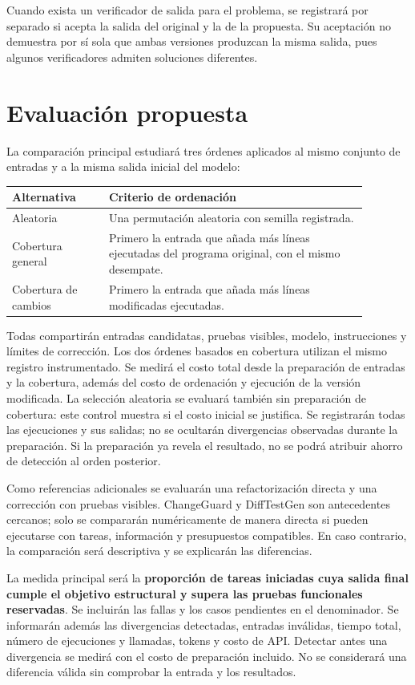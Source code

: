 \documentclass[11pt,openright,final]{unsa}
\begin{document}
Cuando exista un verificador de salida para el problema, se registrará por separado si acepta la salida del original y la de la propuesta. Su aceptación no demuestra por sí sola que ambas versiones produzcan la misma salida, pues algunos verificadores admiten soluciones diferentes.

\section{Evaluación propuesta}

La comparación principal estudiará tres órdenes aplicados al mismo conjunto de entradas y a la misma salida inicial del modelo:

\begin{longtable}{p{0.24\linewidth}p{0.64\linewidth}}
Alternativa & Criterio de ordenación \\
\hline
Aleatoria & Una permutación aleatoria con semilla registrada. \\
Cobertura general & Primero la entrada que añada más líneas ejecutadas del programa original, con el mismo desempate. \\
Cobertura de cambios & Primero la entrada que añada más líneas modificadas ejecutadas. \\
\end{longtable}

Todas compartirán entradas candidatas, pruebas visibles, modelo, instrucciones y límites de corrección. Los dos órdenes basados en cobertura utilizan el mismo registro instrumentado. Se medirá el costo total desde la preparación de entradas y la cobertura, además del costo de ordenación y ejecución de la versión modificada. La selección aleatoria se evaluará también sin preparación de cobertura: este control muestra si el costo inicial se justifica. Se registrarán todas las ejecuciones y sus salidas; no se ocultarán divergencias observadas durante la preparación. Si la preparación ya revela el resultado, no se podrá atribuir ahorro de detección al orden posterior.

Como referencias adicionales se evaluarán una refactorización directa y una corrección con pruebas visibles. ChangeGuard y DiffTestGen son antecedentes cercanos; solo se compararán numéricamente de manera directa si pueden ejecutarse con tareas, información y presupuestos compatibles. En caso contrario, la comparación será descriptiva y se explicarán las diferencias.

La medida principal será la \textbf{proporción de tareas iniciadas cuya salida final cumple el objetivo estructural y supera las pruebas funcionales reservadas}. Se incluirán las fallas y los casos pendientes en el denominador. Se informarán además las divergencias detectadas, entradas inválidas, tiempo total, número de ejecuciones y llamadas, tokens y costo de API. Detectar antes una divergencia se medirá con el costo de preparación incluido. No se considerará una diferencia válida sin comprobar la entrada y los resultados.
\end{document}

